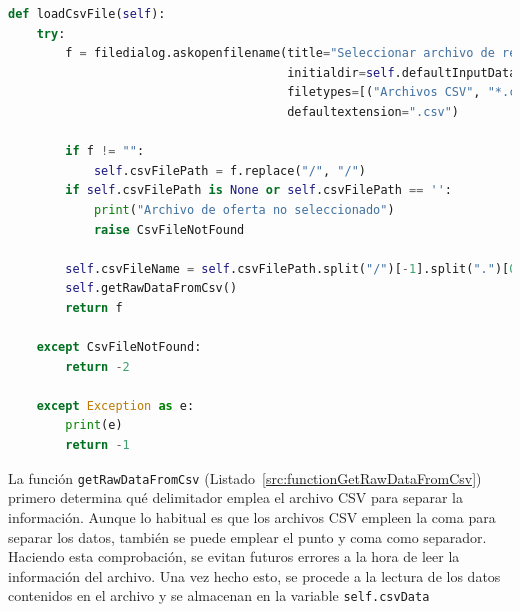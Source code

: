 \begin{lstlisting}[language=Python,
                   style=python,
                   frame=none,
                   numbers=none,
                   basicstyle=\ttfamily\normalsize,
                   caption={Función \texttt{loadCsvFile}},
                   label=src:functionLoadCsvFile,
                   inputencoding=utf8]                   
def loadCsvFile(self):
    try:
        f = filedialog.askopenfilename(title="Seleccionar archivo de resultados",
                                       initialdir=self.defaultInputDataFolder,
                                       filetypes=[("Archivos CSV", "*.csv"), ("Todos los archivos", "*.*")],
                                       defaultextension=".csv")

        if f != "":
            self.csvFilePath = f.replace("/", "/")
        if self.csvFilePath is None or self.csvFilePath == '':
            print("Archivo de oferta no seleccionado")
            raise CsvFileNotFound

        self.csvFileName = self.csvFilePath.split("/")[-1].split(".")[0]
        self.getRawDataFromCsv()
        return f

    except CsvFileNotFound:
        return -2

    except Exception as e:
        print(e)
        return -1
\end{lstlisting}

La función \texttt{getRawDataFromCsv} (Listado~\ref{src:functionGetRawDataFromCsv}) primero determina qué delimitador emplea el archivo \acrshort{CSV} para separar la información. Aunque lo habitual es que los archivos \acrshort{CSV} empleen la coma para separar los datos, también se puede emplear el punto y coma como separador. Haciendo esta comprobación, se evitan futuros errores a la hora de leer la información del archivo. Una vez hecho esto, se procede a la lectura de los datos contenidos en el archivo y se almacenan en la variable \texttt{self.csvData}

